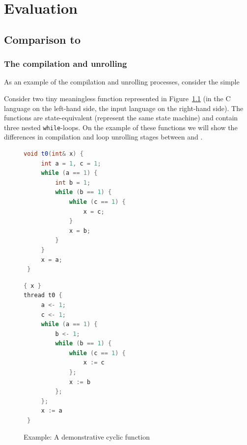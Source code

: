 \chapter{Evaluation}
\label{ch:eval}


\section{Comparison to \porthos[1]}
\label{ch:eval:show}

\subsection{The compilation and unrolling}
\label{ch:eval:show:compil}

As an example of the compilation and unrolling processes, consider the simple


Consider two tiny meaningless function represented in Figure~\ref{ex:test-both-code} (in the C language on the left-hand side, the \porthos[1] input language on the right-hand side).
The functions are state-equivalent (represent the same state machine) and contain three nested \texttt{while}-loops.
On the example of these functions we will show the differences in compilation and loop unrolling stages between \porthos[1] and \porthos[2].

\begin{figure}[!h]
\begin{minipage}{.53\textwidth}
\begin{lstlisting}[language=Java,basicstyle=\ttfamily\small]
void t0(int& x) {
     int a = 1, c = 1;
     while (a == 1) {
         int b = 1;
         while (b == 1) {
             while (c == 1) {
                 x = c;
             }
             x = b;
         }
     }
     x = a;
 }
\end{lstlisting}
\end{minipage}
%
\begin{minipage}{.45\textwidth}
\begin{lstlisting}[language=Java,basicstyle=\ttfamily\small]
{ x }
thread t0 {
     a <- 1;
     c <- 1;
     while (a == 1) {
         b <- 1;
         while (b == 1) {
             while (c == 1) {
                 x := c
             };
             x := b
         };
     };
     x := a
 }
\end{lstlisting}
\end{minipage}
\caption{Example: A demonstrative cyclic function}
\label{ex:test-both-code}
\end{figure}


